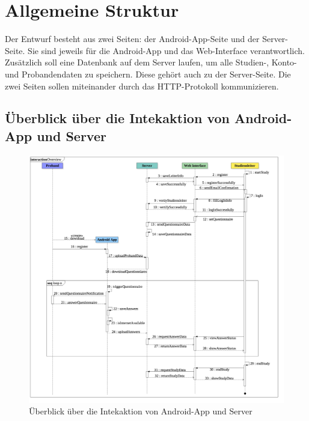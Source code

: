 \documentclass[a4paper]{scrreprt}
\begin{document}
    \tableofcontents

    \chapter{Allgemeine Struktur}

        Der Entwurf besteht aus zwei Seiten: der Android-App-Seite und der Server-Seite. Sie sind jeweils für die Android-App und das Web-Interface verantwortlich. Zusätzlich soll eine Datenbank auf dem Server laufen, um alle Studien-, Konto- und Probandendaten zu speichern. Diese gehört auch zu der Server-Seite. Die zwei Seiten sollen miteinander durch das HTTP-Protokoll kommunizieren.


        \section{Überblick über die Intekaktion von Android-App und Server}


            \vspace*{1cm}
            \begin{figure}[H]
                \includegraphics[scale = 0.25]{Overview.jpg}
                \caption{Überblick über die Intekaktion von Android-App und Server}
            \end{figure}
\end{document}
